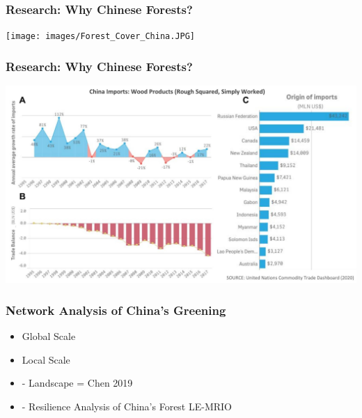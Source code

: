 \begin{frame}
  \frametitle{Research: Why Chinese Forests?}

\begin{center}\texttt{[image: images/Forest\_Cover\_China.JPG]} \end{center}

\end{frame}

\begin{frame}
  \frametitle{Research: Why Chinese Forests?}

\begin{center}\includegraphics[width=0.5\linewidth]{images/comtrade_china_imports_wood.jpeg} \end{center}

\end{frame}

\begin{frame}
  \frametitle{Network Analysis of China's Greening}

  \begin{itemize}
  \item Global Scale
  \item Local Scale
  \item  - Landscape = Chen 2019
  \item  - Resilience Analysis of China's Forest LE-MRIO
  \end{itemize}

\end{frame}

